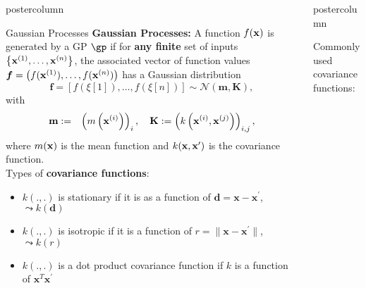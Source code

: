 \documentclass{beamer}
\newlength{\columnheight} %
\begin{document}
\begin{frame}[fragile]{}
\begin{columns}
\begin{column}{.31\textwidth}
\begin{beamercolorbox}[center]{postercolumn}
\begin{minipage}{.98\textwidth}
{\begin{myblock}{Gaussian Processes}
								\textbf{Gaussian Processes:} A function $f(\mathbf{x})$ is generated by a GP $\gp$ if for \textbf{any finite} set of inputs $\left\{\mathbf{x}^{(1)}, \dots, \mathbf{x}^{(n)}\right\}$, the associated vector of function values $\bm{f} = \left(f(\mathbf{x}^{(1)}), \dots, f(\mathbf{x}^{(n)})\right)$ has a Gaussian distribution
								$$
								\bm{f} = \left[f\left(\xi[1]\right),\dots, f\left(\xi[n]\right)\right] \sim \mathcal{N}\left(\bm{m}, \bm{K}\right),
								$$
								with 
								\begin{eqnarray*}
									\textbf{m} &:=& \left(m\left(\mathbf{x}^{(i)}\right)\right)_{i}, \quad
									\textbf{K} := \left(k\left(\mathbf{x}^{(i)}, \mathbf{x}^{(j)}\right)\right)_{i,j}, 
								\end{eqnarray*}
								where $m(\mathbf{x})$ is the mean function and $k(\mathbf{x}, \mathbf{x}^\prime)$ is the covariance function. \\
							
                Types of \textbf{covariance functions}:
								\begin{itemize}[$\bullet$]
									\setlength{\itemindent}{+.3in}
									\item $k(.,.)$ is stationary if it is as a function of $\bm{d} = \bm{x} - \bm{x}^\prime$, $ \leadsto k(\bm{d})$
									\item $k(.,.)$ is isotropic if it is a function of $r = \|\bm{x} - \bm{x}^\prime\|$,  $ \leadsto k(r)$
									\item $k(., .)$ is a dot product covariance function if $k$ is a function of $\bm{x}^T \bm{x}^\prime$
								\end{itemize}

							\end{myblock}
				}
			\end{minipage}
		\end{beamercolorbox}
	\end{column}
	

\begin{column}{.31\textwidth}
\begin{beamercolorbox}[center]{postercolumn}
\begin{minipage}{.98\textwidth}
\parbox[t][\columnheight]{\textwidth}{

\begin{myblock}{}  
							
								Commonly used covariance functions:
								

\end{myblock}}
\end{minipage}
\end{beamercolorbox}
\end{column}
\end{columns}
\end{frame}
\end{document}
